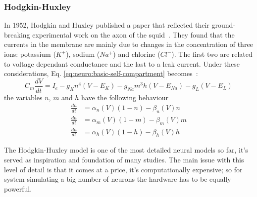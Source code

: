 \subsubsection{Hodgkin-Huxley}
In 1952, Hodgkin and Huxley published a paper that reflected their ground-breaking experimental work on the axon of the squid~\cite{hodgkin-huxley}. They found that the currents in the membrane are mainly due to changes in the concentration of three ions: potassium ($K^{+}$), sodium ($Na^{+}$) and chlorine ($Cl^{-}$). The first two are related to voltage dependant conductance and the last to a leak current. Under these considerations, Eq. \ref{eq:neuro:basic-self-compartment} becomes~\cite{dynamical-systems-Izhikevich2007}:
\begin{equation}
C_{m}\frac{dV}{dt} = I_{e} - g_{K}  n^{4} (V - E_{K}) 
                           - g_{Na} m^{3}h(V - E_{Na})
                           - g_{L}        (V - E_{L})
\label{eq:neuro:hodgkin-huxley}
\end{equation}
the variables $n$, $m$ and $h$ have the following behaviour
\begin{align}
\frac{dn}{dt} &= \alpha_{n}(V) (1 - n) - \beta_{n}(V) n \\[0.5em]
\frac{dn}{dt} &= \alpha_{m}(V) (1 - m) - \beta_{m}(V) m\\[0.5em]
\frac{dn}{dt} &= \alpha_{h}(V) (1 - h) - \beta_{h}(V) h
\end{align}

The Hodgkin-Huxley model is one of the most detailed neural models so far, it's served as inspiration and foundation of many studies. The main issue with this level of detail is that it comes at a price, it's computationally expensive; so for system simulating a big number of neurons the hardware has to be equally powerful.

